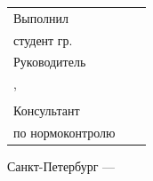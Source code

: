 \vspace{4mm plus2fill}%

\noindent
\begin{tabularx}{\linewidth}{lXl}
	Выполнил              &	   &             \\
	студент гр.~\group     &    & \Author     \\[\mfloatsep]

	Руководитель 		  &    &             \\
	\SupervisorJob,		  &    &             \\
	\SupervisorDegree 	  &    & \Supervisor \\[\mfloatsep]
	
	Консультант  &    &  \\   	
	по нормоконтролю  		 	  &    & \ConsultantNorm  %
\end{tabularx} %


%
\vspace{0pt plus4fill}%


\begin{center}%
Санкт-Петербург --- \thesisYear\\
\end{center}%
\restoregeometry
\newpage
